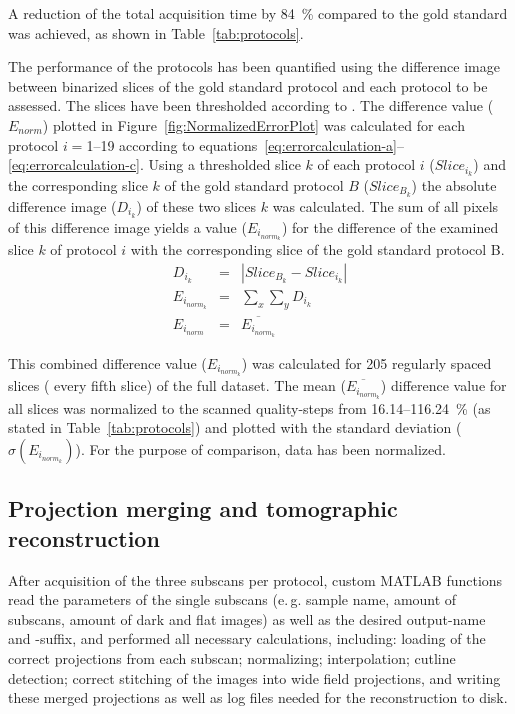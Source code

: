 \documentclass[preprint,s]{iucr}
\newcommand{\eg}{e.\,g. }
\begin{document}
A reduction of the total acquisition time by \SI{84}{\percent} compared to the gold standard was achieved, as shown in Table~\ref{tab:protocols}.

The performance of the protocols has been quantified using the difference image between binarized slices of the gold standard protocol and each protocol to be assessed. The slices have been thresholded according to . The difference value ($E_{norm}$) plotted in Figure~\ref{fig:NormalizedErrorPlot} was calculated for each protocol $i=$1--19 according to equations~\ref{eq:errorcalculation-a}--\ref{eq:errorcalculation-c}. Using a thresholded slice $k$ of each protocol $i$ ($Slice_{i_{k}}$) and the corresponding slice $k$ of the gold standard protocol $B$ ($Slice_{B_{k}}$) the absolute difference image ($D_{i_{k}}$) of these two slices $k$ was calculated. The sum of all pixels of this difference image yields a value ($E_{i_{norm_{k}}}$) for the difference of the examined slice $k$ of protocol $i$ with the corresponding slice of the gold standard protocol B.
\begin{eqnarray}
	D_{i_{k}} &=& |Slice_{B_{k}}-Slice_{i_{k}}|\label{eq:errorcalculation-a}\\%
	E_{i_{norm_{k}}} &=& \sum_{x}\sum_{y} D_{i_{k}}\label{eq:errorcalculation-b}\\%
	E_{i_{norm}} &=& \overline{E_{i_{norm_{k}}}}\label{eq:errorcalculation-c}%
\end{eqnarray}

This combined difference value ($E_{i_{norm_{k}}}$) was calculated for 205 regularly spaced slices (%
every fifth slice) of the full dataset. The mean ($\overline{E_{i_{norm_{k}}}}$) difference value for all slices was normalized to the scanned quality-steps from 16.14--\SI{116.24}{\percent} (as stated in Table~\ref{tab:protocols}) and plotted with the standard deviation ($\sigma(E_{i_{norm_{k}}})$). For the purpose of comparison, data has been normalized.

\subsection{Projection merging and tomographic reconstruction}
After acquisition of the three subscans per protocol, custom MATLAB functions read the parameters of the single subscans (\eg sample name, amount of subscans, amount of dark and flat images) as well as the desired output-name and -suffix, and performed all necessary calculations, including: loading of the correct projections from each subscan; normalizing; interpolation; cutline detection; correct stitching of the images into wide field projections, and writing these merged projections as well as log files needed for the reconstruction to disk.
\end{document}
